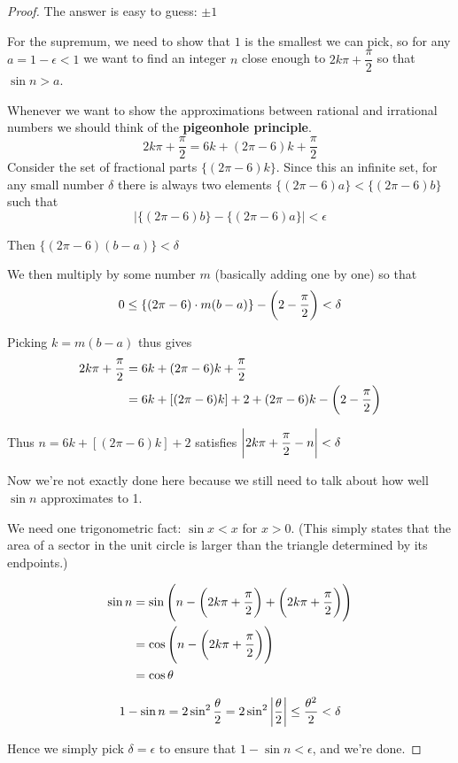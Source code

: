 \begin{proof}
The answer is easy to guess: $\pm1$

For the supremum, we need to show that $1$ is the smallest we can pick, so for any $a=1-\epsilon<1$ we want to find an integer $n$ close enough to $2k\pi+\dfrac{\pi}{2}$ so that $\sin n > a$.

Whenever we want to show the approximations between rational and irrational numbers we should think of the \textbf{pigeonhole principle}.
\[ 2k\pi+\frac{\pi}{2}=6k+(2\pi-6)k+\frac{\pi}{2} \]
Consider the set of fractional parts $\{(2\pi-6)k\}$. Since this an infinite set, for any small number $\delta$ there is always two elements $\{(2\pi-6)a\}<\{(2\pi-6)b\}$ such that
\[ |\{(2\pi-6)b\}-\{(2\pi-6)a\}|<\epsilon \]

Then $\{(2\pi-6)(b-a)\}<\delta$

We then multiply by some number $m$ (basically adding one by one) so that
\[ 0 \le \{(2\pi-6)\cdot m(b-a)\}-\left(2-\frac{\pi}{2}\right)<\delta \]

Picking $k=m(b-a)$ thus gives
\begin{align*}
2k\pi+\frac{\pi}{2} &= 6k+(2\pi-6)k+\frac{\pi}{2} \\
&= 6k+[(2\pi-6)k]+2+{(2\pi-6)k}-\left(2-\frac{\pi}{2}\right)
\end{align*}

Thus $n=6k+[(2\pi-6)k]+2$ satisfies $\left|2k\pi+\dfrac{\pi}{2}-n\right|<\delta$

Now we're not exactly done here because we still need to talk about how well $\sin n$ approximates to 1.

We need one trigonometric fact: $\sin x<x$ for $x>0$. (This simply states that the area of a sector in the unit circle is larger than the triangle determined by its endpoints.)

\begin{align*}
\sin n&=\sin\left(n-\left(2k\pi+\frac{\pi}{2}\right)+\left(2k\pi+\frac{\pi}{2}\right)\right) \\
&=\cos\left(n-\left(2k\pi+\frac{\pi}{2}\right)\right) \\
&=\cos\theta
\end{align*}

\[ 1 - \sin n = 2 \sin^2 \frac{\theta}{2} = 2 \sin^2 \left|\frac{\theta}{2}\right| \le \frac{\theta^2}{2}<\delta \]

Hence we simply pick $\delta=\epsilon$ to ensure that $1 - \sin n<\epsilon$, and we're done.
\end{proof}
\pagebreak

